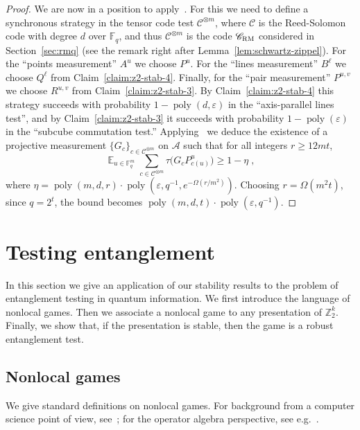 \documentclass[11pt]{article}
\theoremstyle{definition}
\newcommand{\code}{\mathscr{C}}
\DeclareMathOperator*{\Expectation}{\mathbb{E}}
\newcommand{\Es}[1]{\Expectation_{#1}}
\newcommand{\F}{\ensuremath{\mathbb{F}}}
\newcommand{\Z}{\ensuremath{\mathbb{Z}}}
\newcommand{\mA}{\ensuremath{\mathcal{A}}}
\newcommand{\RM}{\ensuremath{\textsc{RM}}}
\DeclareMathOperator{\poly}{poly}
\newcommand{\eps}{\varepsilon}
\begin{document}
\begin{proof}
We are now in a position to apply~\cite[Theorem 4.1]{ji2022quantum}. For this we need to define a synchronous strategy in the tensor code test $\code^{\otimes m}$, where $\code$ is the Reed-Solomon code with degree $d$ over $\F_q$, and thus $\code^{\otimes m}$ is the code $\code_\RM$ considered in Section~\ref{sec:rmq} (see the remark right after Lemma~\ref{lem:schwartz-zippel}). For the ``points measurement'' $A^u$ we choose $P^u$. For the ``lines measurement'' $B^\ell$ we choose $Q^\ell$ from Claim~\ref{claim:z2-stab-4}. Finally, for the ``pair measurement'' $P^{u,v}$ we choose $R^{u,v}$ from Claim~\ref{claim:z2-stab-3}. By Claim~\ref{claim:z2-stab-4} this strategy succeeds with probability $1-\poly(d,\eps)$ in the ``axis-parallel lines test'', and by Claim~\ref{claim:z2-stab-3} it succeeds with probability $1-\poly(\eps)$ in the ``subcube commutation test.'' Applying~\cite[Theorem 4.1]{ji2022quantum} we deduce the existence of a projective measurement $\{G_c\}_{c\in\code^{\otimes m}}$ on $\mA$ such that for all integers $r \geq 12mt$,
\[ \Es{u\in\F_q^m} \sum_{c\in\code^{\otimes m}} \tau\big( G_c P^u_{c(u)}\big) \geq 1-\eta\;,\]
where $\eta = \poly(m,d,r) \cdot\poly(\eps,q^{-1},e^{-\Omega(r/m^2)})$. Choosing $r=\Omega(m^2 t)$, since $q=2^{t}$, the bound becomes $\poly(m,d,t) \cdot\poly(\eps,q^{-1})$.

\end{proof}


\section{Testing entanglement}
\label{sec:quantum}

In this section we give an application of our stability results to the problem of entanglement testing in quantum information. We first introduce the language of nonlocal games. Then we associate a nonlocal game to any presentation of $\Z_2^k$. Finally, we show that, if the presentation is stable, then the game is a robust  entanglement test. 
	
\subsection{Nonlocal games}
\label{sec:nl-games}

We give standard definitions on nonlocal games. For background from a computer science point of view, see~\cite{cleve2004consequences}; for the operator algebra perspective, see e.g.~\cite{kim2018synchronous}.
\end{document}
